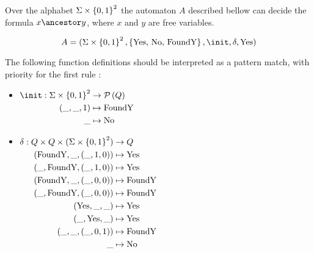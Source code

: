 \documentclass{article}
\begin{document}
\begin{lemma}
	Over the alphabet $\Sigma \times \left\{0,1\right\}^2$ the automaton $A$ described bellow can decide the formula $x  \ancestor y $,
	where $x$ and $y$ are free variables.

	\[A =   (\Sigma \times \set {0,1}^2, \set {\text {Yes, No, FoundY}} ,  \init, \delta, \text{Yes})  \]

	The following function definitions should be interpreted as a pattern match, with priority for the first rule :

	\begin{itemize}
		\item $\begin{aligned}[t]
				      \init      : \Sigma \times \set{0,1}^2 & \to \parts Q          \\
				      (\_, \_, 1)                            & \mapsto \text{FoundY} \\
				      \_                                     & \mapsto \text{No}
			      \end{aligned} $

		\item $\begin{aligned}[t]
				      \delta               : Q \times Q \times (\Sigma \times \left\{0,1\right\}^2) & \to Q                 \\
				      (\text{FoundY}, \_, (\_,1,0))                                         & \mapsto \text{Yes}    \\
				      (\_, \text{FoundY}, (\_,1,0))                                         & \mapsto \text{Yes}    \\
				      (\text{FoundY}, \_, (\_,0,0))                                         & \mapsto \text{FoundY} \\
				      (\_, \text{FoundY}, (\_,0,0))                                         & \mapsto \text{FoundY} \\
				      (\text{Yes}, \_, \_)                                                  & \mapsto \text{Yes}    \\
				      (\_, \text{Yes}, \_)                                                  & \mapsto \text{Yes}    \\
				      (\_, \_, (\_, 0, 1))                                                  & \mapsto \text{FoundY} \\
				      \_                                                                    & \mapsto \text{No}
			      \end{aligned}$
	\end{itemize}
\end{lemma}
\end{document}
